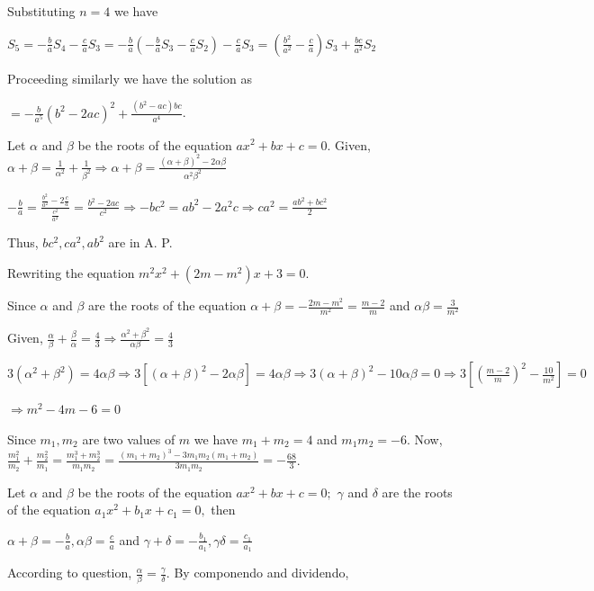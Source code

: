   Substituting $n = 4$ we have

  $S_5 = -\frac{b}{a}S_4 - \frac{c}{a}S_3 = -\frac{b}{a}(-\frac{b}{a}S_3 - \frac{c}{a}S_2) - \frac{c}{a}S_3
  = \left(\frac{b^2}{a^2} - \frac{c}{a}\right)S_3 + \frac{bc}{a^2}S_2$

  Proceeding similarly we have the solution as

  $= -\frac{b}{a^5}(b^2 - 2ac)^2 + \frac{(b^2 - ac)bc}{a^4}$.
\item Let $\alpha$ and $\beta$ be the roots of the equation $ax^2 + bx + c = 0$. Given, $\alpha + \beta =
  \frac{1}{\alpha^2} + \frac{1}{\beta^2}\Rightarrow \alpha + \beta = \frac{(\alpha + \beta)^2 -
    2\alpha\beta}{\alpha^2\beta^2}$

  $-\frac{b}{a} = \frac{\frac{b^2}{a^2} - 2\frac{c}{a}}{\frac{c^2}{a^2}} = \frac{b^2 - 2ac}{c^2}\Rightarrow
  -bc^2 = ab^2 - 2a^2c \Rightarrow ca^2 = \frac{ab^2 + bc^2}{2}$

  Thus, $bc^2, ca^2, ab^2$ are in A. P.
\item Rewriting the equation $m^2x^2 + (2m - m^2)x + 3 = 0$.

  Since $\alpha$ and $\beta$ are the roots of the equation $\alpha + \beta = -\frac{2m - m^2}{m^2} = \frac{m -
    2}{m}$ and $\alpha\beta = \frac{3}{m^2}$

  Given, $\frac{\alpha}{\beta} + \frac{\beta}{\alpha} = \frac{4}{3} \Rightarrow \frac{\alpha^2 + \beta^2}{\alpha\beta} =
  \frac{4}{3}$

  $3(\alpha^2 + \beta^2) = 4\alpha\beta \Rightarrow 3[(\alpha + \beta)^2 - 2\alpha\beta] =
  4\alpha\beta\Rightarrow 3(\alpha + \beta)^2 - 10\alpha\beta = 0 \Rightarrow 3\left[\left(\frac{m -
      2}{m}\right)^2 - \frac{10}{m^2}\right] = 0$

  $\Rightarrow m^2 - 4m - 6 = 0$

  Since $m_1, m_2$ are two values of $m$ we have $m_1 + m_2 = 4$ and $m_1m_2 = -6$. Now, $\frac{m_1^2}{m_2}
  + \frac{m_2^2}{m_1} = \frac{m_1^3 + m_2^3}{m_1m_2} = \frac{(m_1 + m_2)^3 - 3m_1m_2(m_1 + m_2)}{3m_1m_2} =
  -\frac{68}{3}$.
\item Let $\alpha$ and $\beta$ be the roots of the equation $ax^2 + bx + c = 0;$ $\gamma$ and $\delta$
  are the roots of the equation $a_1x^2 + b_1x + c_1 = 0,$ then

  $\alpha + \beta = -\frac{b}{a}, \alpha\beta = \frac{c}{a}$ and $\gamma + \delta = -\frac{b_1}{a_1},
  \gamma\delta = \frac{c_1}{a_1}$

  According to question, $\frac{\alpha}{\beta} = \frac{\gamma}{\delta}$. By componendo and dividendo,

